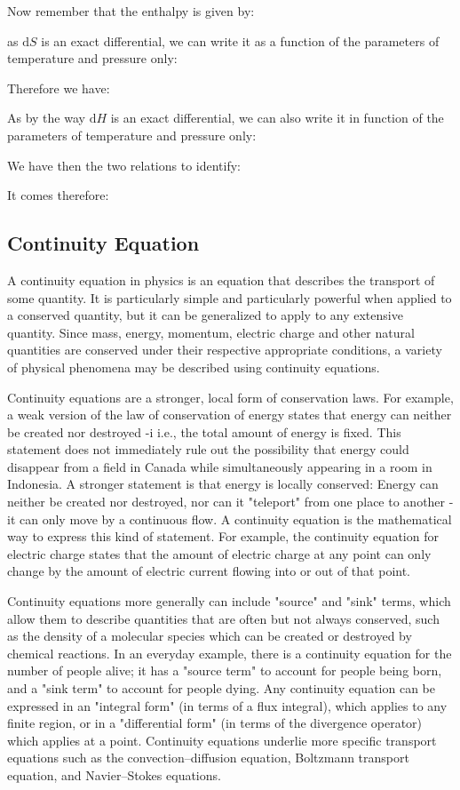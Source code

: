 	Now remember that the enthalpy is given by:
	
	as $\mathrm{d}S$ is an exact differential, we can write it as a function of the parameters of temperature and pressure only:
	
	Therefore we have:
	
	As by the way $\mathrm{d}H$ is an exact differential, we can also write it in function of the parameters of temperature and pressure only:
	
	We have then the two relations to identify:
	
	It comes therefore:
	
	
	\subsection{Continuity Equation}
	A continuity equation in physics is an equation that describes the transport of some quantity. It is particularly simple and particularly powerful when applied to a conserved quantity, but it can be generalized to apply to any extensive quantity. Since mass, energy, momentum, electric charge and other natural quantities are conserved under their respective appropriate conditions, a variety of physical phenomena may be described using continuity equations.
	
	Continuity equations are a stronger, local form of conservation laws. For example, a weak version of the law of conservation of energy states that energy can neither be created nor destroyed -i i.e., the total amount of energy is fixed. This statement does not immediately rule out the possibility that energy could disappear from a field in Canada while simultaneously appearing in a room in Indonesia. A stronger statement is that energy is locally conserved: Energy can neither be created nor destroyed, nor can it "teleport" from one place to another - it can only move by a continuous flow. A continuity equation is the mathematical way to express this kind of statement. For example, the continuity equation for electric charge states that the amount of electric charge at any point can only change by the amount of electric current flowing into or out of that point.
	
	Continuity equations more generally can include "source" and "sink" terms, which allow them to describe quantities that are often but not always conserved, such as the density of a molecular species which can be created or destroyed by chemical reactions. In an everyday example, there is a continuity equation for the number of people alive; it has a "source term" to account for people being born, and a "sink term" to account for people dying.
Any continuity equation can be expressed in an "integral form" (in terms of a flux integral), which applies to any finite region, or in a "differential form" (in terms of the divergence operator) which applies at a point.
Continuity equations underlie more specific transport equations such as the convection–diffusion equation, Boltzmann transport equation, and Navier–Stokes equations.

